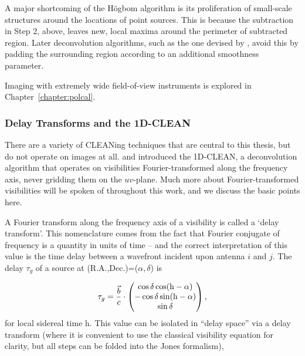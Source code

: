 A major shortcoming of the H{\"o}gbom algorithm is its proliferation of small-scale structures around the locations of point sources. This is because the subtraction in Step 2, above, leaves new, local maxima around the perimeter of subtracted region. Later deconvolution algorithms, such as the one devised by \cite{Cornwell.83}, avoid this by padding the surrounding region according to an additional smoothness parameter. 

Imaging with extremely wide field-of-view instruments is explored in Chapter~\ref{chapter:polcal}.

\subsubsection{Delay Transforms and the 1D-CLEAN}
\label{subsubsec:interferometry_1dclean}
There are a variety of CLEANing techniques that are central to this thesis, but do not operate on images at all.
\cite{ParsonsBacker.09} and \cite{Parsons.12a} introduced the 1D-CLEAN, a deconvolution algorithm that operates on visibilities Fourier-transformed along the frequency axis, never gridding them on the $uv$-plane. Much more about Fourier-transformed visibilities will be spoken of throughout this work, and we discuss the basic points here.

A Fourier transform along the frequency axis of a visibility is called a `delay transform'. This nomenclature comes from the fact that Fourier conjugate of frequency is a quantity in units of time -- and the correct interpretation of this value is the time delay between a wavefront incident upon antenna $i$ and $j$. The delay $\tau_g$ of a source at (R.A.,Dec.)=($\alpha,\delta$) is

\begin{equation}
\tau_g = \frac{\vec{b}}{c}\cdot
\begin{pmatrix}
\cos\delta\cos({\rm h}-\alpha) \\
-\cos\delta\sin({\rm h}-\alpha) \\
\sin\delta \\
\end{pmatrix},
\end{equation}
for local sidereal time h. This value can be isolated in ``delay space'' via a delay transform (where it is convenient to use the classical visibility equation for clarity, but all steps can be folded into the Jones formalism),

